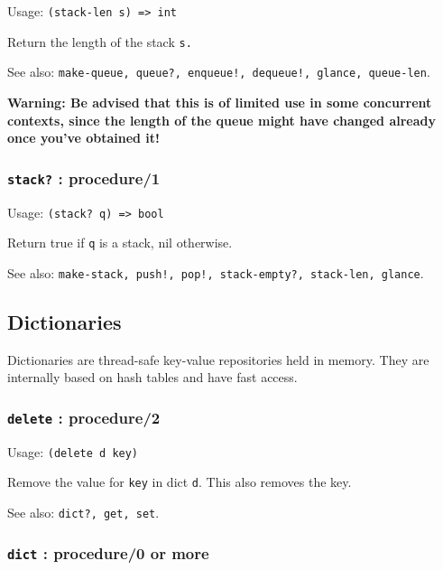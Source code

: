 \documentclass[
]{article}
\newcommand{\passthrough}[1]{#1}
\begin{document}
Usage: \passthrough{\lstinline!(stack-len s) => int!}

Return the length of the stack \passthrough{\lstinline!s.!}

See also:
\passthrough{\lstinline"make-queue, queue?, enqueue!, dequeue!, glance, queue-len"}.

\textbf{Warning: Be advised that this is of limited use in some
concurrent contexts, since the length of the queue might have changed
already once you've obtained it!}

\hypertarget{stack-procedure1}{%
\subsubsection{\texorpdfstring{\texttt{stack?} :
procedure/1}{stack? : procedure/1}}\label{stack-procedure1}}

Usage: \passthrough{\lstinline!(stack? q) => bool!}

Return true if \passthrough{\lstinline!q!} is a stack, nil otherwise.

See also:
\passthrough{\lstinline"make-stack, push!, pop!, stack-empty?, stack-len, glance"}.

\hypertarget{dictionaries}{%
\subsection{Dictionaries}\label{dictionaries}}

Dictionaries are thread-safe key-value repositories held in memory. They
are internally based on hash tables and have fast access.

\hypertarget{delete-procedure2}{%
\subsubsection{\texorpdfstring{\texttt{delete} :
procedure/2}{delete : procedure/2}}\label{delete-procedure2}}

Usage: \passthrough{\lstinline!(delete d key)!}

Remove the value for \passthrough{\lstinline!key!} in dict
\passthrough{\lstinline!d!}. This also removes the key.

See also: \passthrough{\lstinline!dict?, get, set!}.

\hypertarget{dict-procedure0-or-more}{%
\subsubsection{\texorpdfstring{\texttt{dict} : procedure/0 or
more}{dict : procedure/0 or more}}\label{dict-procedure0-or-more}}
\end{document}
